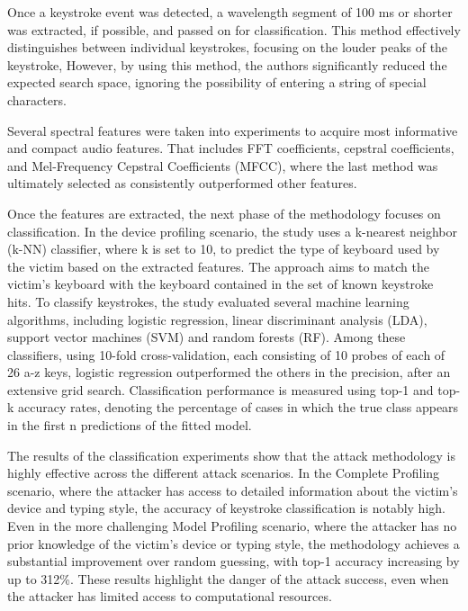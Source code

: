 \documentclass[a4paper,11pt,twoside]{report}
\theoremstyle{definition}
\begin{document}
Once a keystroke event was detected, a wavelength segment of 100 ms or shorter was extracted, if possible, and passed on for classification. This method effectively distinguishes between individual keystrokes, focusing on the louder peaks of the keystroke, However, by using this method, the authors significantly reduced the expected search space, ignoring the possibility of entering a string of special characters.

Several spectral features were taken into experiments to acquire most informative and compact audio features. That includes FFT coefficients, cepstral coefficients, and Mel-Frequency Cepstral Coefficients (MFCC), where the last method was ultimately selected as consistently outperformed other features.

Once the features are extracted, the next phase of the methodology focuses on classification. In the device profiling scenario, the study uses a k-nearest neighbor (k-NN) classifier, where k is set to 10, to predict the type of keyboard used by the victim based on the extracted features. The approach aims to match the victim's keyboard with the keyboard contained in the set of known keystroke hits. To classify keystrokes, the study evaluated several machine learning algorithms, including logistic regression, linear discriminant analysis (LDA), support vector machines (SVM) and random forests (RF). Among these classifiers, using 10-fold cross-validation, each consisting of 10 probes of each of 26 a-z keys, logistic regression outperformed the others in the precision, after an extensive grid search. Classification performance is measured using top-1 and top-k accuracy rates, denoting the percentage of cases in which the true class appears in the first n predictions of the fitted model.

The results of the classification experiments show that the attack methodology is highly effective across the different attack scenarios. In the Complete Profiling scenario, where the attacker has access to detailed information about the victim’s device and typing style, the accuracy of keystroke classification is notably high. Even in the more challenging Model Profiling scenario, where the attacker has no prior knowledge of the victim’s device or typing style, the methodology achieves a substantial improvement over random guessing, with top-1 accuracy increasing by up to 312\%. These results highlight the danger of the attack success, even when the attacker has limited access to computational resources. \\
\end{document}
